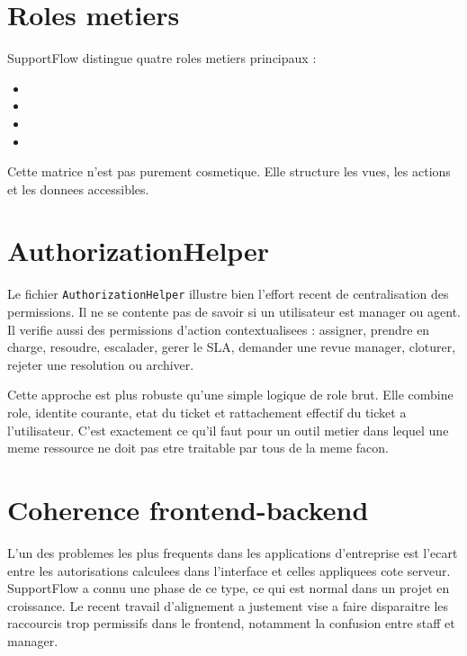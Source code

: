 \section{Roles metiers}

SupportFlow distingue quatre roles metiers principaux :

\begin{itemize}[leftmargin=1.2cm]
  \item {}
  \item {}
  \item {}
  \item {}
\end{itemize}

Cette matrice n'est pas purement cosmetique. Elle structure les vues, les actions et les donnees accessibles.

\section{AuthorizationHelper}

Le fichier \texttt{AuthorizationHelper} illustre bien l'effort recent de centralisation des permissions. Il ne se contente pas de savoir si un utilisateur est manager ou agent. Il verifie aussi des permissions d'action contextualisees : assigner, prendre en charge, resoudre, escalader, gerer le SLA, demander une revue manager, cloturer, rejeter une resolution ou archiver.

Cette approche est plus robuste qu'une simple logique de role brut. Elle combine role, identite courante, etat du ticket et rattachement effectif du ticket a l'utilisateur. C'est exactement ce qu'il faut pour un outil metier dans lequel une meme ressource ne doit pas etre traitable par tous de la meme facon.

\section{Coherence frontend-backend}

L'un des problemes les plus frequents dans les applications d'entreprise est l'ecart entre les autorisations calculees dans l'interface et celles appliquees cote serveur. SupportFlow a connu une phase de ce type, ce qui est normal dans un projet en croissance. Le recent travail d'alignement a justement vise a faire disparaitre les raccourcis trop permissifs dans le frontend, notamment la confusion entre staff et manager.

